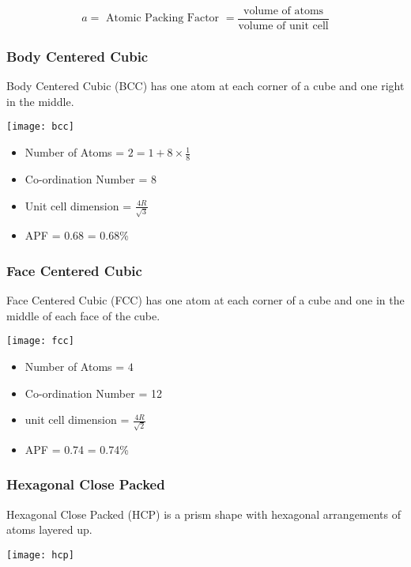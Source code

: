 \documentclass[12pt]{article}
\begin{document}
\begin{equation*}
  a = \text{ Atomic Packing Factor } = \frac{\text{volume of atoms}}{\text{volume of unit cell}}
\end{equation*}

\subsubsection{Body Centered Cubic} 
Body Centered Cubic (BCC) has one atom at each corner of a cube and one right in the middle.
\begin{marginfigure}
  \vspace{ -1cm }
  \texttt{[image: bcc]}
\end{marginfigure}

\begin{itemize}
  \item Number of Atoms = $2 = 1 + 8 \times \frac{1}{8}$
  \item Co-ordination Number = 8 
  \item Unit cell dimension = $\frac{4R}{\sqrt{3}}$
  \item APF = 0.68 = 0.68\%
\end{itemize}

\subsubsection{Face Centered Cubic}
Face Centered Cubic (FCC) has one atom at each corner of a cube and one in the middle of each face of the cube.
\begin{marginfigure}
  \vspace{ -1cm }
  \texttt{[image: fcc]}
\end{marginfigure}

\begin{itemize}
  \item Number of Atoms = $4$
  \item Co-ordination Number = 12 
  \item unit cell dimension = $\frac{4R}{\sqrt{2}}$
  \item APF = 0.74 = 0.74\%
\end{itemize}

\subsubsection{Hexagonal Close Packed}
Hexagonal Close Packed (HCP) is a prism shape with hexagonal arrangements of atoms layered up.
\begin{marginfigure}
  \vspace{ -1cm }
  \texttt{[image: hcp]}
\end{marginfigure}
\end{document}
